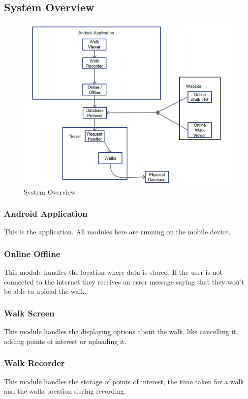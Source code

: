 \documentclass[12pt]{article}
\begin{document}
\subsection{System Overview}
\begin{figure}[htp]
\centering
\includegraphics[scale=0.50]{Project_Plan/docs/ProjectPlan2-3.jpg}
\caption{System Overview}
\label{System Overview}
\end{figure}
\subsubsection{Android Application}
This is the application. All modules here are running on the mobile device.
\subsubsection{Online Offline}
This module handles the location where data is stored. If the user is not connected to the internet they receives an error message saying that they won't be able to upload the walk.
\subsubsection{Walk Screen}
This module handles the displaying options about the walk, like cancelling it, adding points of interest or uploading it.
\subsubsection{Walk Recorder}
This module handles the storage of points of interest, the time taken for a walk and the walks location during recording.
\end{document}
